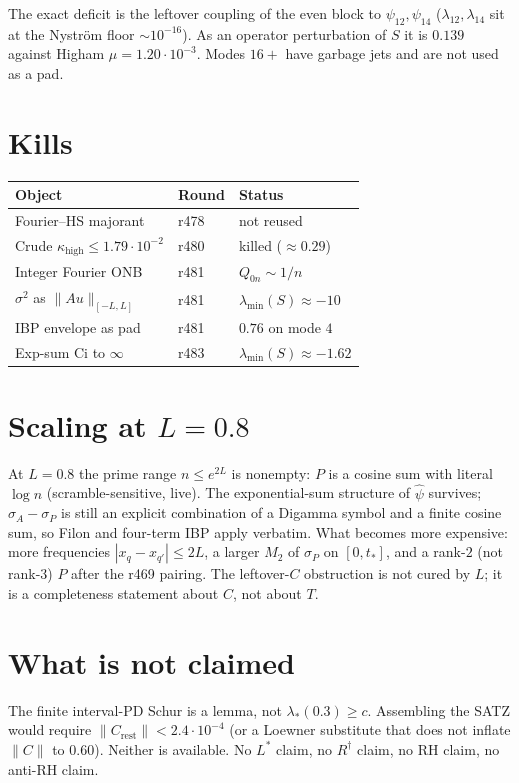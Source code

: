\documentclass[11pt]{article}
\theoremstyle{remark}
\begin{document}
The exact deficit is the leftover coupling of the even
block to $\psi_{12},\psi_{14}$
($\lambda_{12},\lambda_{14}$ sit at the Nystr\"om floor
$\sim10^{-16}$).
As an operator perturbation of $S$ it is
$0.139$ against Higham $\mu=1.20\cdot10^{-3}$.
Modes $16+$ have garbage jets and are not used as a pad.

\section{Kills}

\begin{center}
\small
\begin{tabular}{@{}lll@{}}
\toprule
Object & Round & Status \\
\midrule
Fourier--HS majorant & r478 & not reused \\
Crude $\kappa_{\mathrm{high}}\le1.79\cdot10^{-2}$ & r480 & killed ($\approx0.29$) \\
Integer Fourier ONB & r481 & $Q_{0n}\sim1/n$ \\
$\sigma^2$ as $\|Au\|_{[-L,L]}$ & r481 & $\lambda_{\min}(S)\approx-10$ \\
IBP envelope as pad & r481 & $0.76$ on mode $4$ \\
Exp-sum Ci to $\infty$ & r483 & $\lambda_{\min}(S)\approx-1.62$ \\
\bottomrule
\end{tabular}
\end{center}

\section{Scaling at $L=0.8$}

At $L=0.8$ the prime range $n\le e^{2L}$ is nonempty:
$P$ is a cosine sum with literal $\log n$
(scramble-sensitive, live).
The exponential-sum structure of $\hat\psi$ survives;
$\sigma_A-\sigma_P$ is still an explicit combination of
a Digamma symbol and a finite cosine sum, so Filon and
four-term IBP apply verbatim.
What becomes more expensive: more frequencies
$|x_q-x_{q'}|\le2L$, a larger $M_2$ of $\sigma_P$ on
$[0,t_*]$, and a rank-$2$ (not rank-$3$) $P$ after the
r469 pairing.
The leftover-$C$ obstruction is not cured by $L$;
it is a completeness statement about $C$, not about $T$.

\section{What is not claimed}

The finite interval-PD Schur is a lemma, not
$\lambda_*(0.3)\ge c$.
Assembling the SATZ would require
$\|C_{\mathrm{rest}}\|<2.4\cdot10^{-4}$
(or a Loewner substitute that does not inflate $\|C\|$
to $0.60$).
Neither is available.
No $L^*$ claim, no $R^\dagger$ claim, no RH claim,
no anti-RH claim.
\end{document}
